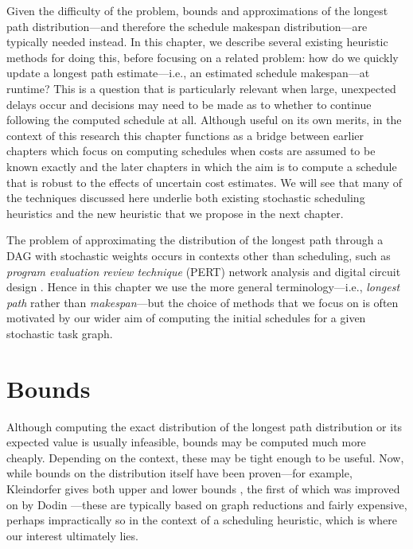 \documentclass[12pt]{article}
\begin{document}
Given the difficulty of the problem, bounds and approximations of the longest path distribution---and therefore the schedule makespan distribution---are typically needed instead. In this chapter, we describe several existing heuristic methods for doing this, before focusing on a related problem: how do we quickly update a longest path estimate---i.e., an estimated schedule makespan---at runtime? This is a question that is particularly relevant when large, unexpected delays occur and decisions may need to be made as to whether to continue following the computed schedule at all. Although useful on its own merits, in the context of this research this chapter functions as a bridge between earlier chapters which focus on computing schedules when costs are assumed to be known exactly and the later chapters in which the aim is to compute a schedule that is robust to the effects of uncertain cost estimates. We will see that many of the techniques discussed here underlie both existing stochastic scheduling heuristics and the new heuristic that we propose in the next chapter.   

The problem of approximating the distribution of the longest path through a DAG with stochastic weights occurs in contexts other than scheduling, such as {\em program evaluation review technique} (PERT) network analysis \cite{mal59} and digital circuit design \cite{bla08}. Hence in this chapter we use the more general terminology---i.e., {\em longest path} rather than {\em makespan}---but the choice of methods that we focus on is often motivated by our wider aim of computing the initial schedules for a given stochastic task graph.   

\section{Bounds}
\label{sect.bounds}

Although computing the exact distribution of the longest path distribution or its expected value is usually infeasible, bounds may be computed much more cheaply. Depending on the context, these may be tight enough to be useful. Now, while bounds on the distribution itself have been proven---for example, Kleindorfer gives both upper and lower bounds \cite{kle71}, the first of which was improved on by Dodin \cite{dod85}---these are typically based on graph reductions and fairly expensive, perhaps impractically so in the context of a scheduling heuristic, which is where our interest ultimately lies.
\end{document}
